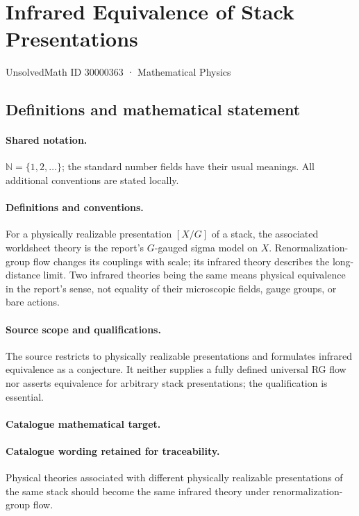 \documentclass[11pt]{article}
\begin{document}
\setcounter{section}{30000362}
\section{Infrared Equivalence of Stack Presentations}\label{30000363}
{\small UnsolvedMath ID 30000363 · Mathematical Physics}
\subsection{Definitions and mathematical statement}

\paragraph{Shared notation.}$\mathbb N=\{1,2,\ldots\}$; the standard number fields have their usual meanings. All additional conventions are stated locally.


\paragraph{Definitions and conventions.} For a physically realizable presentation $[X/G]$ of a stack, the associated worldsheet theory is the report's $G$-gauged sigma model on $X$. Renormalization-group flow changes its couplings with scale; its infrared theory describes the long-distance limit. Two infrared theories being the same means physical equivalence in the report's sense, not equality of their microscopic fields, gauge groups, or bare actions.

\paragraph{Source scope and qualifications.} The source restricts to physically realizable presentations and formulates infrared equivalence as a conjecture. It neither supplies a fully defined universal RG flow nor asserts equivalence for arbitrary stack presentations; the qualification is essential.

\paragraph{Catalogue mathematical target.}
\paragraph{Catalogue wording retained for traceability.}
Physical theories associated with different physically realizable presentations of the same stack should become the same infrared theory under renormalization-group flow.
\end{document}
